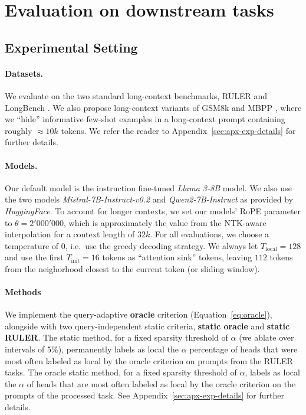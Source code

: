 \section{Evaluation on downstream tasks}
\label{sec:downstream}

\subsection{Experimental Setting}
\label{sec:expsetting}





\paragraph{Datasets.}
We evaluate on the two standard long-context benchmarks, RULER \citep{hsieh2024ruler} and LongBench \citep{bai2024longbench}. We also propose long-context variants of  GSM8k \citep{cobbe2021training} and MBPP \citep{austin2021program}, where we  ``hide''  informative few-shot examples in a long-context prompt containing roughly $\approx 10k$ tokens. We refer the reader to Appendix~\ref{sec:apx-exp-details} for further details. 



\paragraph{Models.}
Our default model is the instruction fine-tuned \textit{Llama 3-8B} model.
We also use the two models
 \textit{Mistral-7B-Instruct-v0.2} and  \textit{Qwen2-7B-Instruct} as provided by \textit{HuggingFace}.
    To account for longer contexts, we set our models' RoPE parameter to $\theta = 2'000'000$, which is approximately the value from the NTK-aware interpolation \citep{peng2023ntk} for a context length of $32k$. 
 For all evaluations, we choose a temperature of $0$, i.e.~use the greedy decoding strategy. We always let $T_{\text{local}} = 128$ and use the first $T_{\text{init}}=16$ tokens as ``attention sink'' tokens, leaving $112$ tokens from the neighorhood closest to the current token (or sliding window).




\paragraph{Methods}
We implement the query-adaptive \textbf{oracle} criterion (Equation~\ref{eq:oracle}), alongside with two query-independent static criteria, \textbf{static oracle} and \textbf{static RULER}. The static method, for a fixed sparsity threshold of $\alpha$ (we ablate over intervals of 5\%), permanently labels as local the $\alpha$ percentage of heads that were most often labeled as local by the oracle criterion on prompts from the RULER tasks. 
The oracle static method, for a fixed sparsity threshold of $\alpha$, labels as local the $\alpha$ of heads that are most often labeled as local by the oracle criterion on the prompts of the processed task. See Appendix~\ref{sec:apx-exp-details} for further details.

